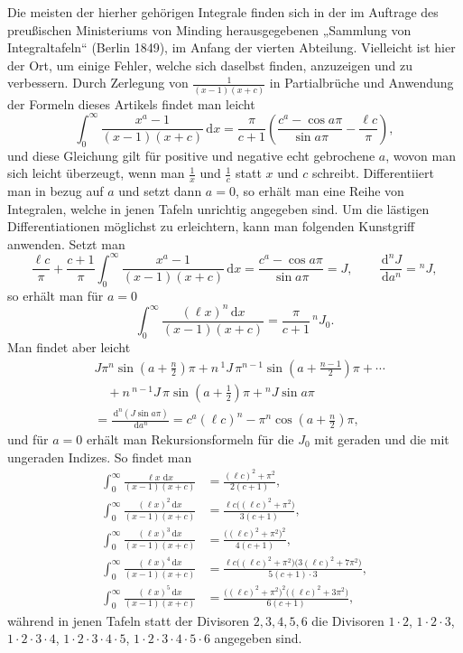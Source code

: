 \documentclass[11pt]{article}
\newcommand{\dd}{\,\mathrm d}
\begin{document}
Die meisten der hierher gehörigen Integrale finden sich in der im Auftrage des preußischen Ministeriums von Minding herausgegebenen „Sammlung von Integraltafeln“ (Berlin 1849), im Anfang der vierten Abteilung. Vielleicht ist hier der Ort, um einige Fehler, welche sich daselbst finden, anzuzeigen und zu verbessern. Durch Zerlegung von $\frac1{(x-1)(x+c)}$ in Partialbrüche und Anwendung der Formeln dieses Artikels findet man leicht
\[
\int_0^\infty\frac{x^a-1}{(x-1)(x+c)}\dd x
=\frac{\pi}{c+1}
\left(\frac{c^a-\cos a\pi}{\sin a\pi}
-\frac{\ell c}{\pi}\right),
\]
und diese Gleichung gilt für positive und negative echt gebrochene $a$, wovon man sich leicht überzeugt, wenn man $\frac1x$ und $\frac1c$ statt $x$ und $c$ schreibt. Differentiiert man in bezug auf $a$ und setzt dann $a=0$, so erhält man eine Reihe von Integralen, welche in jenen Tafeln unrichtig angegeben sind. Um die lästigen Differentiationen möglichst zu erleichtern, kann man folgenden Kunstgriff anwenden. Setzt man
\[
\frac{\ell c}{\pi}+\frac{c+1}{\pi}
\int_0^\infty\frac{x^a-1}{(x-1)(x+c)}\dd x
=\frac{c^a-\cos a\pi}{\sin a\pi}=J,
\qquad
\frac{\dd^nJ}{\dd a^n}={}^{n}J,
\]
so erhält man für $a=0$
\[
\int_0^\infty\frac{(\ell x)^n\dd x}{(x-1)(x+c)}
=\frac{\pi}{c+1}\,{}^{n}J_0.
\]
Man findet aber leicht
\[
\begin{aligned}
&J\pi^n\sin\left(a+\frac n2\right)\pi
+n\,{}^{1}J\,\pi^{n-1}\sin\left(a+\frac{n-1}{2}\right)\pi+\cdots\\
&\quad{}+n\,{}^{n-1}J\,\pi\sin\left(a+\frac12\right)\pi
+{}^{n}J\sin a\pi\\
&=\frac{\dd^n(J\sin a\pi)}{\dd a^n}
=c^a(\ell c)^n-\pi^n\cos\left(a+\frac n2\right)\pi,
\end{aligned}
\]
und für $a=0$ erhält man Rekursionsformeln für die $J_0$ mit geraden und die mit ungeraden Indizes. So findet man
\[
\begin{aligned}
\int_0^\infty\frac{\ell x\,\dd x}{(x-1)(x+c)}
&=\frac{(\ell c)^2+\pi^2}{2(c+1)},\\
\int_0^\infty\frac{(\ell x)^2\dd x}{(x-1)(x+c)}
&=\frac{\ell c\bigl((\ell c)^2+\pi^2\bigr)}{3(c+1)},\\
\int_0^\infty\frac{(\ell x)^3\dd x}{(x-1)(x+c)}
&=\frac{\bigl((\ell c)^2+\pi^2\bigr)^2}{4(c+1)},\\
\int_0^\infty\frac{(\ell x)^4\dd x}{(x-1)(x+c)}
&=\frac{\ell c\bigl((\ell c)^2+\pi^2\bigr)
        \bigl(3(\ell c)^2+7\pi^2\bigr)}{5(c+1)\cdot3},\\
\int_0^\infty\frac{(\ell x)^5\dd x}{(x-1)(x+c)}
&=\frac{\bigl((\ell c)^2+\pi^2\bigr)^2
        \bigl((\ell c)^2+3\pi^2\bigr)}{6(c+1)},
\end{aligned}
\]
während in jenen Tafeln statt der Divisoren $2,3,4,5,6$ die Divisoren $1\cdot2$, $1\cdot2\cdot3$, $1\cdot2\cdot3\cdot4$, $1\cdot2\cdot3\cdot4\cdot5$, $1\cdot2\cdot3\cdot4\cdot5\cdot6$ angegeben sind.
\end{document}
